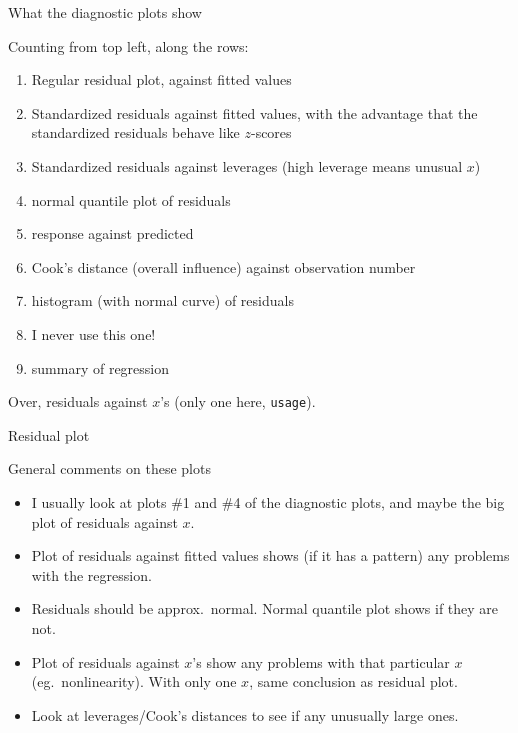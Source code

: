 \documentclass[unknownkeysallowed]{beamer}\usepackage[]{graphicx}\usepackage[]{color}
\begin{document}
\begin{frame}[fragile]{What the diagnostic plots show}
  
  Counting from top left, along the rows:
  
  \begin{enumerate}
  \item Regular residual plot, against fitted values 
  \item Standardized residuals against fitted values, with the
    advantage that the standardized residuals behave like $z$-scores
  \item Standardized residuals against leverages (high leverage means
    unusual $x$)
  \item normal quantile plot of residuals
  \item response against predicted
  \item Cook's distance (overall influence) against observation number
  \item histogram (with normal curve) of residuals
  \item I never use this one!
  \item summary of regression
  \end{enumerate}
  
  Over, residuals against $x$'s (only one here, \texttt{usage}).
  
\end{frame}

\begin{frame}[fragile]{Residual plot}
  
  
\end{frame}

\begin{frame}[fragile]{General comments on these plots}
  
  \begin{itemize}
  \item I usually look at plots \#1 and \#4 of the diagnostic plots,
    and maybe the big plot of residuals against $x$.
  \item Plot of residuals against fitted values shows (if it has a
    pattern) any problems with the regression.
  \item Residuals should be approx.\ normal. Normal quantile plot
    shows if they are not.
  \item Plot of residuals against $x$'s show any problems with that
    particular $x$ (eg.\ nonlinearity). With only one $x$, same
    conclusion as residual plot.
  \item Look at leverages/Cook's distances to see if any unusually
    large ones.
  \end{itemize}
  
\end{frame}
\end{document}
